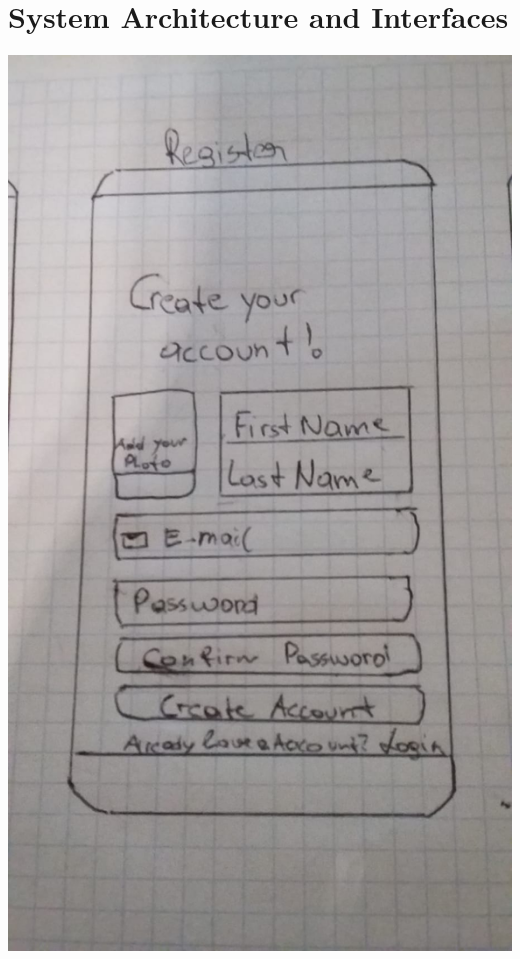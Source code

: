\documentclass[12pt]{article}
\theoremstyle{definition}
\begin{document}
\section{System Architecture and Interfaces}
\includegraphics[scale=.2]{Gui/register.jpeg}


\pagebreak
\end{document}
